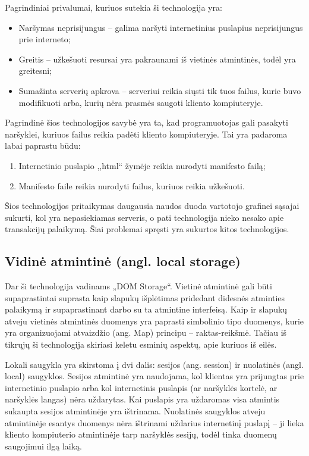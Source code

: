 \documentclass[12pt,a4paper,titlepage]{article}
\begin{document}
Pagrindiniai privalumai, kuriuos sutekia ši technologija yra:
\begin{itemize}
  \item Naršymas neprisijungus – galima naršyti internetinius puslapius neprisijungus prie interneto;
  \item Greitis – užkešuoti resursai yra pakraunami iš vietinės atmintinės, todėl yra greitesni;
  \item Sumažinta serverių apkrova – serveriui reikia siųsti tik tuos failus, kurie buvo modifikuoti arba, kurių nėra prasmės saugoti kliento kompiuteryje.
\end{itemize}
Pagrindinė šios technologijos savybė yra ta, kad programuotojas gali pasakyti naršyklei, kuriuos failus reikia padėti kliento kompiuteryje. Tai yra padaroma labai paprastu būdu:
\begin{enumerate}
  \item Internetinio puslapio ,,html`` žymėje reikia nurodyti manifesto failą;
  \item Manifesto faile reikia nurodyti failus, kuriuos reikia užkešuoti.
\end{enumerate}
Šios technologijos pritaikymas daugausia naudos duoda vartotojo grafinei sąsajai sukurti, kol yra nepasiekiamas serveris, o pati technologija nieko nesako apie transakcijų palaikymą. Šiai problemai spręsti yra sukurtos kitos technologijos.

\subsection{Vidinė atmintinė (angl. local storage)}

Dar ši technologija vadinams „DOM Storage“. Vietinė atmintinė gali būti supaprastintai suprasta kaip slapukų išplėtimas pridedant didesnės atminties palaikymą ir supaprastinant darbo su ta atmintine interfeisą. Kaip ir slapukų atveju vietinės atmintinės duomenys yra paprasti simbolinio tipo duomenys, kurie yra organizuojami atvaizdžio (ang. Map) principu – raktas-reikšmė. Tačiau iš tikrųjų ši technologija skiriasi keletu esminių aspektų, apie kuriuos iš eilės. 

Lokali saugykla yra skirstoma į dvi dalis: sesijos (ang. session) ir nuolatinės (angl. local) saugyklos. Sesijos atmintinė yra naudojama, kol klientas yra prijungtas prie internetinio puslapio arba kol internetinis puslapis (ar naršyklės kortelė, ar naršyklės langas) nėra uždarytas. Kai puslapis yra uždaromas visa atmintis sukaupta sesijos atmintinėje yra ištrinama. Nuolatinės saugyklos atveju atmintinėje esantys duomenys nėra ištrinami uždarius internetinį puslapį – ji lieka kliento kompiuterio atmintinėje tarp naršyklės sesijų, todėl tinka duomenų saugojimui ilgą laiką.
\end{document}
